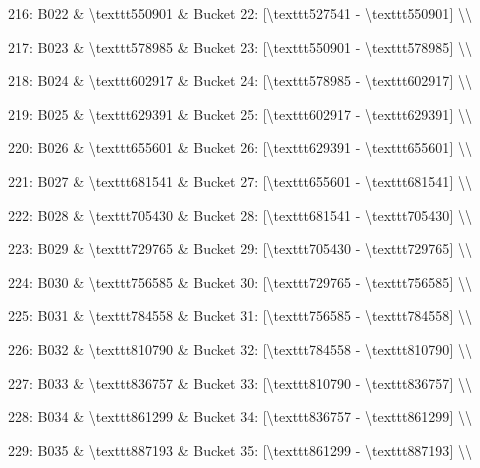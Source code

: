 \documentclass[11pt,a4paper]{article}
\begin{document}
216: B022 \& \textbackslash{}texttt{550901} \& Bucket 22: [\textbackslash{}texttt{527541} - \textbackslash{}texttt{550901}] \textbackslash{}\textbackslash{}

217: B023 \& \textbackslash{}texttt{578985} \& Bucket 23: [\textbackslash{}texttt{550901} - \textbackslash{}texttt{578985}] \textbackslash{}\textbackslash{}

218: B024 \& \textbackslash{}texttt{602917} \& Bucket 24: [\textbackslash{}texttt{578985} - \textbackslash{}texttt{602917}] \textbackslash{}\textbackslash{}

219: B025 \& \textbackslash{}texttt{629391} \& Bucket 25: [\textbackslash{}texttt{602917} - \textbackslash{}texttt{629391}] \textbackslash{}\textbackslash{}

220: B026 \& \textbackslash{}texttt{655601} \& Bucket 26: [\textbackslash{}texttt{629391} - \textbackslash{}texttt{655601}] \textbackslash{}\textbackslash{}

221: B027 \& \textbackslash{}texttt{681541} \& Bucket 27: [\textbackslash{}texttt{655601} - \textbackslash{}texttt{681541}] \textbackslash{}\textbackslash{}

222: B028 \& \textbackslash{}texttt{705430} \& Bucket 28: [\textbackslash{}texttt{681541} - \textbackslash{}texttt{705430}] \textbackslash{}\textbackslash{}

223: B029 \& \textbackslash{}texttt{729765} \& Bucket 29: [\textbackslash{}texttt{705430} - \textbackslash{}texttt{729765}] \textbackslash{}\textbackslash{}

224: B030 \& \textbackslash{}texttt{756585} \& Bucket 30: [\textbackslash{}texttt{729765} - \textbackslash{}texttt{756585}] \textbackslash{}\textbackslash{}

225: B031 \& \textbackslash{}texttt{784558} \& Bucket 31: [\textbackslash{}texttt{756585} - \textbackslash{}texttt{784558}] \textbackslash{}\textbackslash{}

226: B032 \& \textbackslash{}texttt{810790} \& Bucket 32: [\textbackslash{}texttt{784558} - \textbackslash{}texttt{810790}] \textbackslash{}\textbackslash{}

227: B033 \& \textbackslash{}texttt{836757} \& Bucket 33: [\textbackslash{}texttt{810790} - \textbackslash{}texttt{836757}] \textbackslash{}\textbackslash{}

228: B034 \& \textbackslash{}texttt{861299} \& Bucket 34: [\textbackslash{}texttt{836757} - \textbackslash{}texttt{861299}] \textbackslash{}\textbackslash{}

229: B035 \& \textbackslash{}texttt{887193} \& Bucket 35: [\textbackslash{}texttt{861299} - \textbackslash{}texttt{887193}] \textbackslash{}\textbackslash{}
\end{document}
